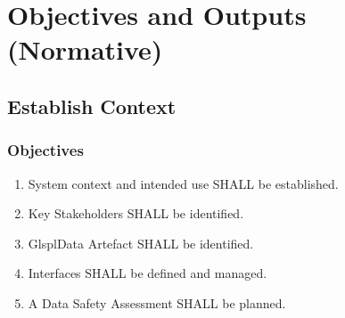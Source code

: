 %
%
\section{Objectives and Outputs (Normative)} \label{bkm:objectivesoutputs}


\subsection{Establish Context}
\subsubsection{Objectives}
\begin{enumerate}[label=\color{dsiwgAccentColour}{1-\arabic*}]
	\item System context and intended use SHALL be established.
	\item Key Stakeholders SHALL be identified.
	\item {}Glspl{Data Artefact} SHALL be identified.
	\item Interfaces SHALL be defined and managed.
	\item A Data Safety Assessment SHALL be planned.
\end{enumerate}

